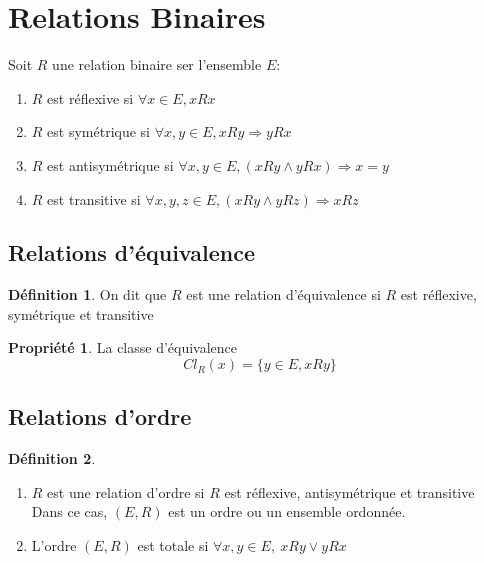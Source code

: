 \documentclass[fleqn]{article}
\theoremstyle{definition} \newtheorem*{defi}{D\'efinition}
\theoremstyle{definition} \newtheorem*{theo}{Th\'eor\`eme}
\theoremstyle{definition} \newtheorem*{coro}{Corollaire}
\theoremstyle{remark} \newtheorem*{rqs}{Remarques}
\theoremstyle{definition} \newtheorem*{prop}{Propri\'et\'e}
\begin{document}
\section{Relations Binaires}
Soit \(R\) une relation binaire ser l'ensemble \(E\):
\begin{enumerate}
	\item \(R\) est r\'eflexive si \(\forall x \in E, xRx\)
	\item \(R\) est sym\'etrique si \(\forall x,y \in E, xRy \Rightarrow yRx\)
	\item \(R\) est antisym\'etrique si \(\forall x,y \in E, (xRy \land yRx) \Rightarrow x=y\)
	\item \(R\) est transitive si \(\forall x,y,z \in E, (xRy \land yRz) \Rightarrow xRz\)
\end{enumerate}

\subsection{Relations d'\'equivalence}
\begin{defi}
	On dit que \(R\) est une relation d'\'equivalence si \(R\) est r\'eflexive, sym\'etrique et transitive
\end{defi}
\begin{prop} La classe d'\'equivalence
	\[Cl_R(x) = \{y \in E ,xRy\}\]
\end{prop}

\subsection{Relations d'ordre}
\begin{defi} $ $
	\begin{enumerate}
		\item \(R\) est une relation d'ordre si \(R\) est r\'eflexive, antisym\'etrique et transitive \\
			Dans ce cas, \((E,R)\) est un ordre ou un ensemble ordonn\'ee.
		\item L'ordre \((E,R)\) est totale si \(\forall x,y \in E,\ xRy \lor yRx\)
	\end{enumerate}
\end{defi}
\end{document}
